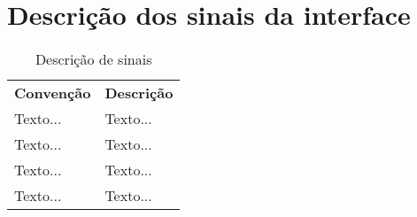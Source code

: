 \section{Descrição dos sinais da interface} %
\label{sec:descrição_detalhada_de_sinais}


\begin{table}[h]
   \centering
    {\renewcommand\arraystretch{1.25}
       \caption{Descrição de sinais}
       \vspace{0.3cm}
        \begin{tabular}{ l l }
         \cline{1-1}\cline{2-2}  
         \multicolumn{1}{|p{3.850cm}|}{\textbf{Convenção} \centering } &
         \multicolumn{1}{p{8cm}|}{\textbf{Descrição} \centering }
           \\  
           \cline{1-1}\cline{2-2}  
          \multicolumn{1}{|p{3.850cm}|}{\vspace{0.3cm} Texto... \centering } &
           \multicolumn{1}{p{8cm}|}{Texto... \centering }
             \\  
             \cline{1-1}\cline{2-2}  
             \multicolumn{1}{|p{3.850cm}|}{\vspace{0.4cm} Texto... \centering } &
             \multicolumn{1}{p{8cm}|}{Texto... \centering }
               \\  
               \cline{1-1}\cline{2-2}  
               \multicolumn{1}{|p{3.850cm}|}{\vspace{0.1cm} Texto... \centering } &
               \multicolumn{1}{p{8cm}|}{Texto... \centering } 
              \\
               \cline{1-1}\cline{2-2}
               \multicolumn{1}{|p{3.850cm}|}{\vspace{0.1cm} Texto... \centering } & 
               \multicolumn{1}{p{8cm}|}{Texto... \centering }
                \\
                   \hline
                   
               \end{tabular}  }
                   \end{table}
